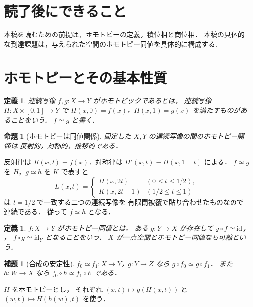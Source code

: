 \documentclass[a5paper,10pt,onecolumn]{jsarticle}
\makeatletter
\theoremstyle{mathnotetheorem}
\newtheorem{definition}[theorem]{定義}
\newtheorem{lemma}[theorem]{補題}
\newtheorem{proposition}[theorem]{命題}
\renewcommand{\proofname}{証明}
\renewenvironment{proof}[1][\proofname]{%
  \par\pushQED{\qed}\normalfont\topsep4\p@\@plus2\p@\relax
  \trivlist\item[\hskip\labelsep\bfseries #1]\ignorespaces
}{\popQED\endtrivlist\@endpefalse}
\makeatother
\begin{document}
\section*{読了後にできること}
本稿を読むための前提は，ホモトピーの定義，積位相と商位相．
本稿の具体的な到達課題は，与えられた空間のホモトピー同値を具体的に構成する．


\section{ホモトピーとその基本性質}
\begin{definition}
連続写像 $f,g:X\to Y$ がホモトピックであるとは，
連続写像 $H:X\times[0,1]\to Y$ で
$H(x,0)=f(x)$，$H(x,1)=g(x)$ を満たすものがあることをいう．
$f\simeq g$ と書く．
\end{definition}
\begin{proposition}[ホモトピーは同値関係]
固定した $X,Y$ の連続写像の間のホモトピー関係は
反射的，対称的，推移的である．
\end{proposition}
\begin{proof}
反射律は $H(x,t)=f(x)$，対称律は
$H'(x,t)=H(x,1-t)$ による．
$f\simeq g$ を $H$，$g\simeq h$ を $K$ で表すと
\[
 L(x,t)=\begin{cases}H(x,2t)&(0\le t\le1/2),\\
 K(x,2t-1)&(1/2\le t\le1)\end{cases}
\]
は $t=1/2$ で一致する二つの連続写像を
有限閉被覆で貼り合わせたものなので連続である．
従って $f\simeq h$ となる．
\end{proof}
\begin{definition}
$f:X\to Y$ がホモトピー同値とは，
ある $g:Y\to X$ が存在して
$g\circ f\simeq\mathrm{id}_X$，
$f\circ g\simeq\mathrm{id}_Y$ となることをいう．
$X$ が一点空間とホモトピー同値なら可縮という．
\end{definition}
\begin{lemma}[合成の安定性]
$f_0\simeq f_1:X\to Y$，$g:Y\to Z$ なら
$g\circ f_0\simeq g\circ f_1$．
また $h:W\to X$ なら
$f_0\circ h\simeq f_1\circ h$ である．
\end{lemma}
\begin{proof}
$H$ をホモトピーとし，
それぞれ $(x,t)\mapsto g(H(x,t))$ と
$(w,t)\mapsto H(h(w),t)$ を使う．
\end{proof}
\end{document}
